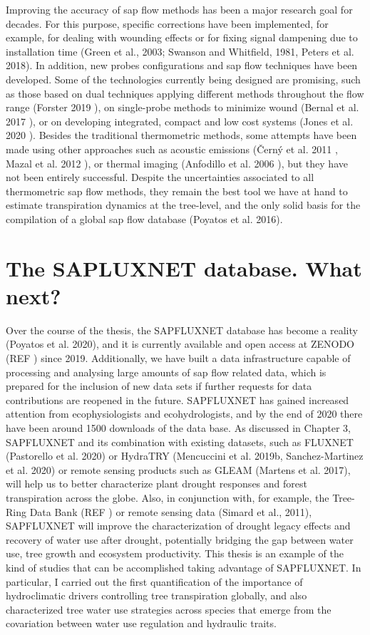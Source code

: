 \documentclass[11pt,twoside]{reedthesis}
\begin{document}
Improving the accuracy of sap flow methods has been a major research
goal for decades. For this purpose, specific corrections have been
implemented, for example, for dealing with wounding effects or for
fixing signal dampening due to installation time (Green et al., 2003;
Swanson and Whitfield, 1981, Peters et al. 2018). In addition, new
probes configurations and sap flow techniques have been developed. Some
of the technologies currently being designed are promising, such as
those based on dual techniques applying different methods throughout the
flow range (Forster 2019 ), on single-probe methods to minimize wound
(Bernal et al. 2017 ), or on developing integrated, compact and low cost
systems (Jones et al. 2020 ). Besides the traditional thermometric
methods, some attempts have been made using other approaches such as
acoustic emissions (Černý et al. 2011 , Mazal et al. 2012 ), or thermal
imaging (Anfodillo et al. 2006 ), but they have not been entirely
successful. Despite the uncertainties associated to all thermometric sap
flow methods, they remain the best tool we have at hand to estimate
transpiration dynamics at the tree-level, and the only solid basis for
the compilation of a global sap flow database (Poyatos et al. 2016).\par

\section{The SAPLUXNET database. What
next?}\label{the-sapluxnet-database.-what-next}

Over the course of the thesis, the SAPFLUXNET database has become a
reality (Poyatos et al. 2020), and it is currently available and open
access at ZENODO (REF ) since 2019. Additionally, we have built a data
infrastructure capable of processing and analysing large amounts of sap
flow related data, which is prepared for the inclusion of new data sets
if further requests for data contributions are reopened in the future.
SAPFLUXNET has gained increased attention from ecophysiologists and
ecohydrologists, and by the end of 2020 there have been around 1500
downloads of the data base. As discussed in Chapter 3, SAPFLUXNET and
its combination with existing datasets, such as FLUXNET (Pastorello et
al. 2020) or HydraTRY (Mencuccini et al. 2019b, Sanchez-Martinez et al.
2020) or remote sensing products such as GLEAM (Martens et al. 2017),
will help us to better characterize plant drought responses and forest
transpiration across the globe. Also, in conjunction with, for example,
the Tree-Ring Data Bank (REF ) or remote sensing data (Simard et al.,
2011), SAPFLUXNET will improve the characterization of drought legacy
effects and recovery of water use after drought, potentially bridging
the gap between water use, tree growth and ecosystem productivity. This
thesis is an example of the kind of studies that can be accomplished
taking advantage of SAPFLUXNET. In particular, I carried out the first
quantification of the importance of hydroclimatic drivers controlling
tree transpiration globally, and also characterized tree water use
strategies across species that emerge from the covariation between water
use regulation and hydraulic traits.\par
\end{document}
